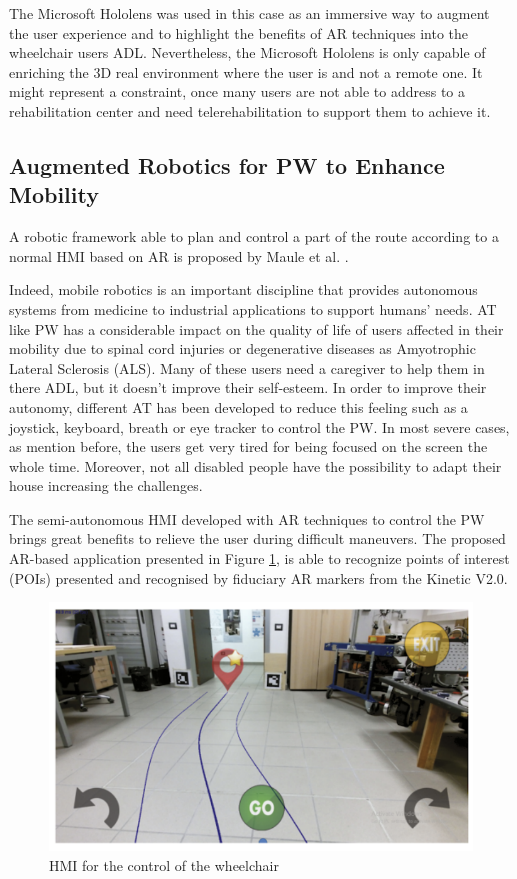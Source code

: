 The Microsoft Hololens was used in this case as an immersive way to augment the user experience and to highlight the benefits of AR techniques into the wheelchair users ADL. Nevertheless, the Microsoft Hololens is only capable of enriching the 3D real environment where the user is and not a remote one. It might represent a constraint, once many users are not able to address to a rehabilitation center and need telerehabilitation to support them to achieve it.

\subsection{Augmented Robotics for PW to Enhance Mobility}
A robotic framework able to plan and control a part of the route according to a normal HMI based on AR is proposed by Maule et al. \cite{maule2017}. 

Indeed, mobile robotics is an important discipline that provides autonomous systems from medicine to industrial applications to support humans' needs. AT like PW has a considerable impact on the quality of life of users affected in their mobility due to spinal cord injuries or degenerative diseases as Amyotrophic Lateral Sclerosis (ALS). Many of these users need a caregiver to help them in there ADL, but it doesn't improve their self-esteem. In order to improve their autonomy, different AT has been developed to reduce this feeling such as a joystick, keyboard, breath or eye tracker to control the PW. In most severe cases, as mention before, the users get very tired for being focused on the screen the whole time. Moreover, not all disabled people have the possibility to adapt their house increasing the challenges. 

The semi-autonomous HMI developed with AR techniques to control the PW  brings great benefits to relieve the user during difficult maneuvers.  The proposed AR-based application presented in Figure \ref{fig:maule2017}, is able to recognize points of interest (POIs) presented and recognised by fiduciary AR markers from the Kinetic V2.0. 

\begin{figure}[!hbt]
\begin{center}
\includegraphics[width=0.94 \textwidth]{img/cap3/maule2017-AR}
\caption{HMI for the control of the wheelchair \cite{maule2017}}
\label{fig:maule2017}
\end{center}
\end{figure}

